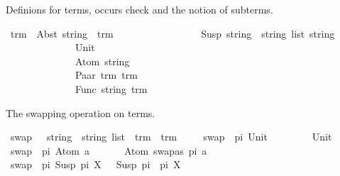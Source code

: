 %
\begin{isabellebody}%
%
%
\isadelimtheory
%
\endisadelimtheory
%
\isatagtheory
%
\endisatagtheory
{\isafoldtheory}%
%
\isadelimtheory
%
\endisadelimtheory
%
\isadelimdocument
%
\endisadelimdocument
%
\isatagdocument
%
\isamarkuptrue%
%
\endisatagdocument
{\isafolddocument}%
%
\isadelimdocument
%
\endisadelimdocument
%
\begin{isamarkuptext}%
Definions for terms, occurs check and the notion of subterms.%
\end{isamarkuptext}\isamarkuptrue%
\isamarkupfalse%
\ trm\ {\isacharequal}{\kern0pt}\ Abst\ string\ \ trm\ \ \ \isanewline
\ \ \ \ \ \ \ \ \ \ \ \ \ {\isacharbar}{\kern0pt}\ Susp\ {\isachardoublequoteopen}{\isacharparenleft}{\kern0pt}string\ {\isasymtimes}\ string{\isacharparenright}{\kern0pt}\ list{\isachardoublequoteclose}\ string\isanewline
\ \ \ \ \ \ \ \ \ \ \ \ \ {\isacharbar}{\kern0pt}\ Unit\ \ \ \ \ \ \ \ \ \ \ \ \ \ \ \ \ \ \ \ \ \ \ \ \ \ \ \ \ \ \ \ \ \ \ \isanewline
\ \ \ \ \ \ \ \ \ \ \ \ \ {\isacharbar}{\kern0pt}\ Atom\ string\ \ \ \ \ \ \ \ \ \ \ \ \ \ \ \ \ \ \ \ \ \ \ \ \ \ \ \isanewline
\ \ \ \ \ \ \ \ \ \ \ \ \ {\isacharbar}{\kern0pt}\ Paar\ trm\ trm\ \ \ \ \ \ \ \ \ \ \ \ \ \ \ \ \ \ \ \ \ \ \ \ \ \ \isanewline
\ \ \ \ \ \ \ \ \ \ \ \ \ {\isacharbar}{\kern0pt}\ Func\ string\ trm%
\begin{isamarkuptext}%
The swapping operation on terms.%
\end{isamarkuptext}\isamarkuptrue%
\isamarkupfalse%
\ swap\ \ {\isacharcolon}{\kern0pt}{\isacharcolon}{\kern0pt}\ {\isachardoublequoteopen}{\isacharparenleft}{\kern0pt}string\ {\isasymtimes}\ string{\isacharparenright}{\kern0pt}\ list\ {\isasymRightarrow}\ trm\ {\isasymRightarrow}\ trm{\isachardoublequoteclose}\isanewline
\ \ \isanewline
\ \ {\isachardoublequoteopen}swap\ \ pi\ {\isacharparenleft}{\kern0pt}Unit{\isacharparenright}{\kern0pt}\ \ \ \ \ \ \ \ {\isacharequal}{\kern0pt}\ Unit{\isachardoublequoteclose}\ \isanewline
{\isacharbar}{\kern0pt}\ {\isachardoublequoteopen}swap\ \ pi\ {\isacharparenleft}{\kern0pt}Atom\ a{\isacharparenright}{\kern0pt}\ \ \ \ \ \ {\isacharequal}{\kern0pt}\ Atom\ {\isacharparenleft}{\kern0pt}swapas\ pi\ a{\isacharparenright}{\kern0pt}{\isachardoublequoteclose}\isanewline
{\isacharbar}{\kern0pt}\ {\isachardoublequoteopen}swap\ \ pi\ {\isacharparenleft}{\kern0pt}Susp\ pi{\isacharprime}{\kern0pt}\ X{\isacharparenright}{\kern0pt}\ \ {\isacharequal}{\kern0pt}\ Susp\ {\isacharparenleft}{\kern0pt}pi\ {\isacharat}{\kern0pt}\ pi{\isacharprime}{\kern0pt}{\isacharparenright}{\kern0pt}\ X{\isachardoublequoteclose}\isanewline

\end{isabellebody}
